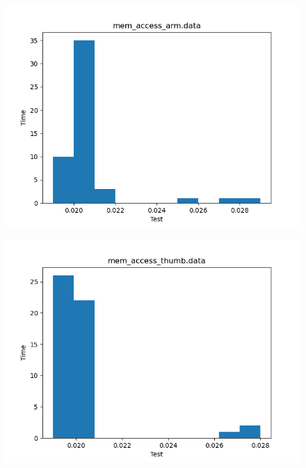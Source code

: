\documentclass[a4paper,10pt]{article}
\begin{document}
\begin{figure}[H]
 \includegraphics[width=\linewidth]{data/mem_access_arm_histogram.png}
\end{figure}

\begin{figure}[H]
 \includegraphics[width=\linewidth]{data/mem_access_thumb_histogram.png}
\end{figure}
\end{document}

